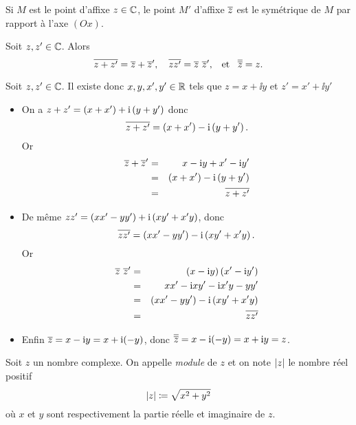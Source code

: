 \documentclass{magnolia}
\begin{document}
\begin{remarqueUnique}
\remarque Si $M$ est le point d'affixe $z\in\mathbb{C}$, le point $M'$ d'affixe $\overline{z}$ est le symétrique de $M$ par rapport à l'axe $(Ox).$
\end{remarqueUnique}

\begin{proposition}[utile=-3]
  Soit $z,z'\in\mathbb{C}$. Alors
 \[\overline{z+z'}=\overline{z}+\overline{z}', \quad \overline{z z'}=\overline{z}\ \overline{z}', \quad\!\text{et}\quad\! \overline{\overline{z}}=z.\]
\end{proposition}
\begin{preuve} Soit $z,z'\in\mathbb{C}$. Il existe donc $x,y,x',y'\in\mathbb{R}$ tels que
    $z=x+\ii y$ et $z'=x'+\ii y'$
  \begin{itemize}
  \item On a $z+z'=\left(x+x'\right)+{\rm i} \left(y+y'\right)$ donc
    \[\overline{z+z'}=\left(x+x'\right)-{\rm i} \left(y+y'\right).\] Or
    \begin{eqnarray*}
    \overline{z}+\overline{z}'
    &=& x-{\rm i} y+x'-{\rm i} y'\\
    &=& \left(x+x'\right)-{\rm i} \left(y+y'\right)\\
    &=& \overline{z+z'}
    \end{eqnarray*}
  \item
    De même $zz'=\left(xx'-yy'\right)+{\rm i} \left(xy'+x'y\right)$, donc
    \[\overline{zz'}=\left(xx'-yy'\right)-{\rm i} \left(xy'+x'y\right).\] Or
    \begin{eqnarray*}
    \overline{z}\ \overline{z}'
    &=& \left(x-{\rm i} y\right)\left(x'-{\rm i} y'\right)\\
    &=& xx'-{\rm i} xy'-{\rm i} x'y-yy'\\
    &=& \left(xx'-yy'\right)-{\rm i} \left(xy'+x'y\right)\\
    &=& \overline{z z'}
    \end{eqnarray*}
  \item Enfin $\overline{z}=x-{\rm i} y=x+{\rm i}(-y)$, donc
    $\overline{\overline{z}}=x-{\rm i}(-y)=x+{\rm i} y=z$.
  \end{itemize}
\end{preuve}

\begin{definition}[utile=-3]
Soit $z$ un nombre complexe. On appelle \emph{module} de $z$ et on note $\left|z\right|$ le nombre réel positif
\[\left|z\right|\coloneqq\sqrt{x^2+y^2}\]
où $x$ et $y$ sont respectivement la partie réelle et imaginaire de $z$.
\end{definition}
\end{document}
